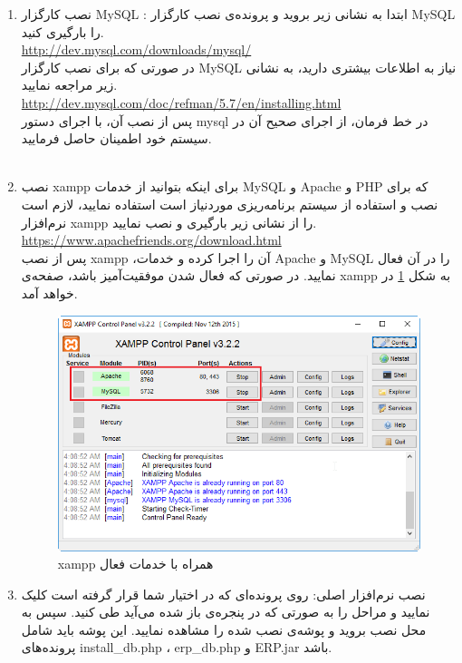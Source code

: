 \begin{enumerate}
	\item نصب کارگزار MySQL :
	ابتدا به نشانی زیر بروید و پرونده‌ی نصب کارگزار MySQL را بارگیری کنید.\\
\url{http://dev.mysql.com/downloads/mysql/}\\


در صورتی که برای نصب کارگزار MySQL نیاز به اطلاعات بیشتری دارید، به نشانی زیر مراجعه نمایید.\\
\url{http://dev.mysql.com/doc/refman/5.7/en/installing.html}\\

	پس از نصب آن، با اجرای دستور mysql در خط فرمان، از اجرای صحیح آن در سیستم خود اطمینان حاصل فرمایید.\\	\\	
	
	
	\item نصب xampp
	برای اینکه بتوانید از خدمات MySQL و Apache و PHP که برای نصب و استفاده از سیستم برنامه‌ریزی موردنیاز است استفاده نمایید، لازم است نرم‌افزار xampp را از نشانی زیر بارگیری و نصب نمایید.\\
\url{https://www.apachefriends.org/download.html}\\
	
	پس از نصب  xampp ،آن را اجرا کرده و خدمات Apache و MySQL را در آن فعال نمایید. در صورتی که فعال شدن موفقیت‌آمیز باشد، صفحه‌ی xampp به شکل
	\ref{f13}
	در خواهد آمد.
	
		\begin{figure}[H]
			\centering
			\includegraphics[scale=0.7]{img/install/xampp}
			\caption{xampp همراه با خدمات فعال}
			\label{f13}
		\end{figure}
		
		
	\item نصب نرم‌افزار اصلی: روی پرونده‌ای که در اختیار شما قرار گرفته است کلیک نمایید و مراحل را به صورتی که در پنجره‌ی باز شده می‌آید طی کنید.
سپس به محل نصب بروید و پوشه‌ی نصب شده را مشاهده نمایید. این پوشه باید شامل پرونده‌های install\_db.php ، erp\_db.php و ERP.jar باشد.


\end{enumerate}
